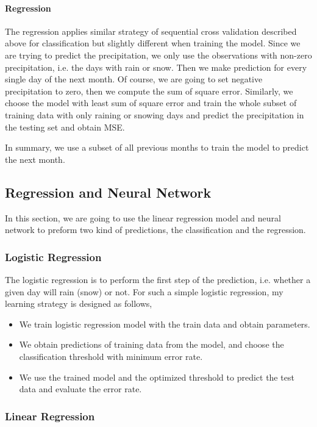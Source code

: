 \documentclass[a4paper,11pt]{article}
\begin{document}
\paragraph{Regression} The regression applies similar strategy of sequential cross validation described above for classification but slightly different when training the model. Since we are trying to predict the precipitation, we only use the observations with non-zero precipitation, i.e. the days with rain or snow. Then we make prediction for every single day of the next month. Of course, we are going to set negative precipitation to zero, then we compute the sum of square error. Similarly, we choose the model with least sum of square error and train the whole subset of training data with only raining or snowing days and predict the precipitation in the testing set and obtain MSE.

In summary, we use a subset of all previous months to train the model to predict the next month.

\subsection{Regression and Neural Network}

In this section, we are going to use the linear regression model and  neural network to preform two kind of predictions, the classification and the regression.\par

\subsubsection{Logistic Regression}

The logistic regression is to perform the first step of the prediction, i.e. whether a given day will rain (snow) or not. For such a simple logistic regression, my learning strategy is designed as follows,
\begin{itemize}
	\item We train logistic regression model with the train data and obtain parameters.
	\item We obtain predictions of training data from the model, and choose the classification threshold with minimum error rate.
	\item We use the trained model and the optimized threshold to predict the test data and evaluate the error rate.
\end{itemize}


\subsubsection{Linear Regression}
\end{document}
